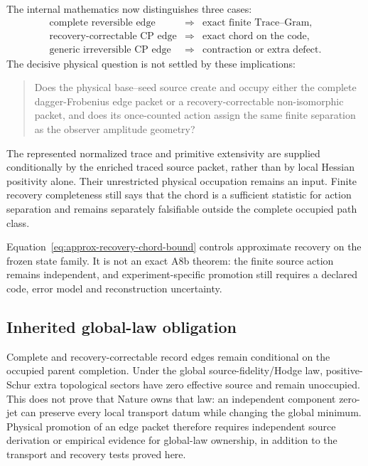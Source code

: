 \documentclass[11pt]{article}
\begin{document}
The internal mathematics now distinguishes three cases:
\begin{equation}
 \begin{array}{ccl}
 \text{complete reversible edge}&\Rightarrow&\text{exact finite Trace--Gram},\\
 \text{recovery-correctable CP edge}&\Rightarrow&\text{exact chord on the code},\\
 \text{generic irreversible CP edge}&\Rightarrow&\text{contraction or extra defect}.
 \end{array}
 \label{eq:three-case-fork}
\end{equation}
The decisive physical question is not settled by these implications:
\begin{quote}
Does the physical base--seed source create and occupy either the complete
dagger-Frobenius edge packet or a recovery-correctable non-isomorphic packet,
and does its once-counted action assign the same finite separation as the
observer amplitude geometry?
\end{quote}

The represented normalized trace and primitive extensivity are supplied
conditionally by the enriched traced source packet, rather than by local
Hessian positivity alone. Their unrestricted physical occupation remains an
input. Finite recovery completeness still says that the chord is a sufficient
statistic for action separation and remains separately falsifiable outside the
complete occupied path class.

Equation~\eqref{eq:approx-recovery-chord-bound} controls approximate recovery
on the frozen state family.  It is not an exact A8b theorem: the finite source
action remains independent, and experiment-specific promotion still requires
a declared code, error model and reconstruction uncertainty.

\subsection*{Inherited global-law obligation}

Complete and recovery-correctable record edges remain conditional on the
occupied parent completion.  Under the global source-fidelity/Hodge law,
positive-Schur extra topological sectors have zero effective source and remain
unoccupied.  This does not prove that Nature owns that law: an independent
component zero-jet can preserve every local transport datum while changing
the global minimum.  Physical promotion of an edge packet therefore requires
independent source derivation or empirical evidence for global-law ownership,
in addition to the transport and recovery tests proved here.
\end{document}
